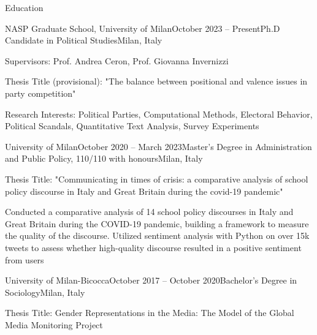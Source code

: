 \documentclass{cv} %
\begin{document}

\begin{rSection}{Education}

\begin{rSubsection}{NASP Graduate School, University of Milan}{October 2023 -- Present}{Ph.D Candidate in Political Studies}{Milan, Italy}
\item Supervisors: Prof. Andrea Ceron, Prof. Giovanna Invernizzi
\item Thesis Title (provisional): "The balance between positional and valence issues in party competition"
\item Research Interests: Political Parties, Computational Methods, Electoral Behavior, Political Scandals, Quantitative Text Analysis, Survey Experiments
\end{rSubsection}

\begin{rSubsection}{University of Milan}{October 2020 -- March 2023}{Master's Degree in Administration and Public Policy, 110/110 with honours}{Milan, Italy}
\item Thesis Title: "Communicating in times of crisis: a comparative analysis of school policy discourse in Italy and Great Britain during the covid-19 pandemic"
\item Conducted a comparative analysis of 14 school policy discourses in Italy and Great Britain during the COVID-19 pandemic, building a framework to measure the quality of the discourse. Utilized sentiment analysis with Python on over 15k tweets to assess whether high-quality discourse resulted in a positive sentiment from users
\end{rSubsection}

\begin{rSubsection}{University of Milan-Bicocca}{October 2017 -- October 2020}{Bachelor's Degree in Sociology}{Milan, Italy}
\item Thesis Title: Gender Representations in the Media: The Model of the Global Media Monitoring Project
\end{rSubsection}

\end{rSection}

\end{document}
